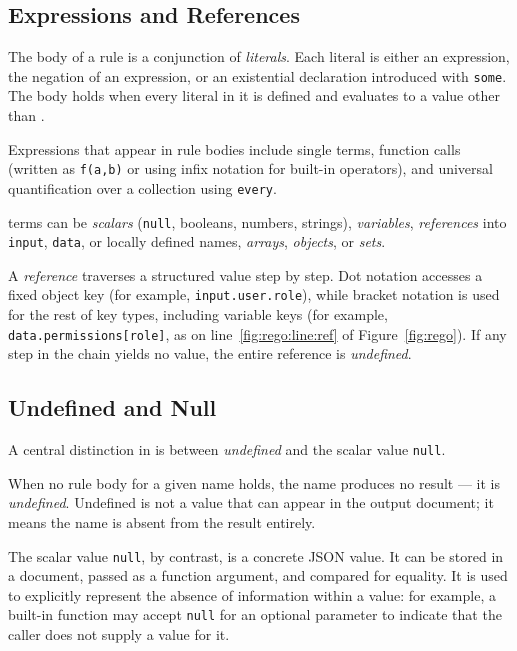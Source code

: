 \subsection{Expressions and References}
\label{ssec:rego-expressions}

The body of a rule is a conjunction of \emph{literals}.
Each literal is either an expression, the negation of an expression, or an existential declaration introduced with \texttt{some}.
The body holds when every literal in it is defined and evaluates to a value other than \false.

Expressions that appear in rule bodies include single terms, function calls (written as \texttt{f(a,b)} or using infix notation for built-in operators), and universal quantification over a collection using \texttt{every}.

\rego terms can be \emph{scalars} (\texttt{null}, booleans, numbers, strings), \emph{variables}, \emph{references} into \texttt{input}, \texttt{data}, or locally defined names, \emph{arrays}, \emph{objects}, or \emph{sets}.

A \emph{reference} traverses a structured value step by step.
Dot notation accesses a fixed object key (for example, \texttt{input.user.role}), while bracket notation is used for the rest of key types, including variable keys (for example, \texttt{data.permissions[role]}, as on line~\ref{fig:rego:line:ref} of Figure~\ref{fig:rego}).
If any step in the chain yields no value, the entire reference is \emph{undefined}.

\subsection{Undefined and Null}
\label{ssec:rego-undef}

A central distinction in \rego is between \emph{undefined} and the scalar value \texttt{null}.

When no rule body for a given name holds, the name produces no result — it is \emph{undefined}.
Undefined is not a value that can appear in the output document; it means the name is absent from the result entirely.

The scalar value \texttt{null}, by contrast, is a concrete JSON value.
It can be stored in a document, passed as a function argument, and compared for equality.
It is used to explicitly represent the absence of information within a value: for example, a built-in function may accept \texttt{null} for an optional parameter to indicate that the caller does not supply a value for it.

